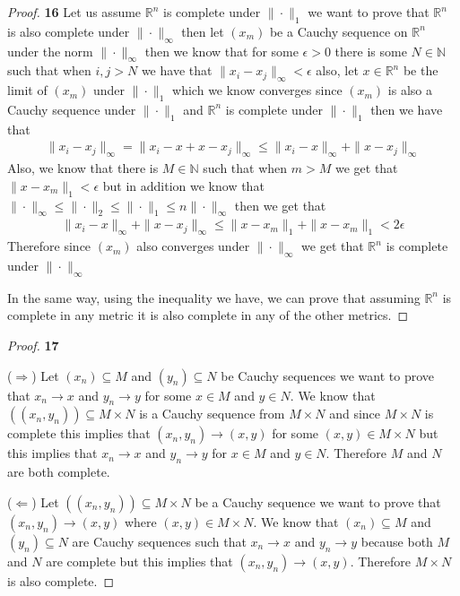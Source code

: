 \documentclass[11pt]{article}
\newcommand{\N}{\mathbb{N}}
\newcommand{\R}{\mathbb{R}}
\theoremstyle{definition}
\begin{document}
	\begin{proof}{\textbf{16}}
        Let us assume $\R^n$ is complete under $\|\cdot\|_1$ we want to prove
        that $\R^n$ is also complete under $\|\cdot\|_\infty$ then
        let $(x_m)$ be a Cauchy sequence on $\R^n$ under the norm
        $\|\cdot\|_\infty$ then we know that for some $\epsilon > 0$ there is
        some $N \in \N$ such that when $i,j > N$ we
        have that $\|x_{i} - x_{j}\|_\infty < \epsilon$ also, let $x \in \R^n$ 
        be the limit of $(x_m)$ under $\|\cdot\|_1$ which we know converges
        since $(x_m)$ is also a Cauchy sequence under $\|\cdot\|_1$ and
        $\R^n$ is complete under $\|\cdot\|_1$ then we have that 
        \begin{align*}
            \|x_{i} - x_{j}\|_\infty = \|x_{i} - x + x - x_{j}\|_\infty
            \leq \|x_{i} - x\|_\infty + \|x - x_{j}\|_\infty
        \end{align*}
        Also, we know that there is $M \in \N$ such that when $m > M$
        we get that $\|x - x_m\|_1 < \epsilon$ but in addition we know that
        $\|\cdot\|_\infty \leq \|\cdot\|_2 \leq \|\cdot\|_1  \leq n\|\cdot\|_\infty$
        then we get that
        \begin{align*}
            \|x_{i} - x\|_\infty + \|x - x_{j}\|_\infty
            \leq \|x - x_m\|_1 + \|x - x_m\|_1 < 2\epsilon
        \end{align*}
        Therefore  since $(x_m)$ also converges under $\|\cdot\|_\infty$
        we get that $\R^n$ is complete under $\|\cdot\|_\infty$

        In the same way, using the inequality we have, we can prove that assuming
        $\R^n$ is complete in any metric it is also complete in any of the
        other metrics.
    \end{proof}
	\begin{proof}{\textbf{17}}

        ($\Rightarrow$)
        Let $(x_n) \subseteq M$ and $(y_n) \subseteq N$ be Cauchy sequences we
        want to prove that $x_n \to x$ and $y_n \to y$ for some $x \in M$ and
        $y \in N$. We know that $((x_n, y_n)) \subseteq M \times N$ is a Cauchy 
        sequence from $M \times N$ and since $M \times N$ is complete this
        implies that $(x_n, y_n) \to (x,y)$ for some $(x,y) \in M \times N$ but
        this implies that $x_n \to x$ and $y_n \to y$ for $x \in M$ and
        $y \in N$. Therefore $M$ and $N$ are both complete.

        ($\Leftarrow$)
        Let $((x_n, y_n)) \subseteq M \times N$ be a Cauchy sequence we want to
        prove that $(x_n,y_n) \to (x,y)$ where $(x,y) \in M \times N$. We know
        that $(x_n) \subseteq M$ and $(y_n) \subseteq N$ are Cauchy sequences
        such that $x_n \to x$ and $y_n \to y$ because both $M$ and $N$ are
        complete but this implies that $(x_n, y_n) \to (x,y)$. Therefore
        $M \times N$ is also complete.
    \end{proof}
\end{document}
